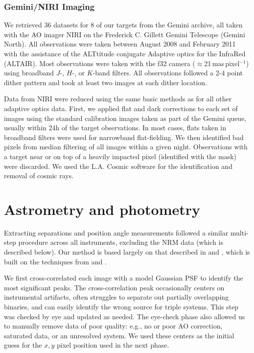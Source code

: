 \documentclass[twocolumn]{aastex62}
\begin{document}
\subsubsection{Gemini/NIRI Imaging}
We retrieved 36 datasets for 8 of our targets from the Gemini archive, all taken with the AO imager NIRI \citep{2003PASP..115.1388H} on the Frederick C. Gillett Gemini Telescope (Gemini North). All observations were taken between August 2008 and February 2011 with the assistance of the ALTtitude conjugate Adaptive optics for the InfraRed (ALTAIR). Most observations were taken with the f32 camera ($\approx$21\,mas\,pixel$^{-1}$) using broadband $J$-, $H$-, or $K$-band filters. All observations followed a 2-4 point dither pattern and took at least two images at each dither location. 

Data from NIRI were reduced using the same basic methods as for all other adaptive optics data. First, we applied flat and dark corrections to each set of images using the standard calibration images taken as part of the Gemini queue, usually within 24h of the target observations. In most cases, flats taken in broadband filters were used for narrowband flat-fielding. We then identified bad pixels from median filtering of all images within a given night. Observations with a target near or on top of a heavily impacted pixel (identified with the mask) were discarded. We used the L.A. Cosmic software for the identification and removal of cosmic rays. 

\section{Astrometry and photometry}\label{sec:astrometry}

Extracting separations and position angle measurements followed a similar multi-step procedure across all instruments, excluding the NRM data (which is described below). Our method is based largely on that described in \citet{2016ApJ...817...80D} and \citet{Dupuy2017}, which is built on the techniques from \citet{2008ApJ...689..436L} and \citet{2010ApJ...721.1725D}.

We first cross-correlated each image with a model Gaussian PSF to identify the most significant peaks. The cross-correlation peak occasionally centers on instrumental artifacts, often struggles to separate out partially overlapping binaries, and can easily identify the wrong source for triple systems. This step was checked by eye and updated as needed. The eye-check phase also allowed us to manually remove data of poor quality: e.g., no or poor AO correction, saturated data, or an unresolved system. We used these centers as the initial guess for the $x, y$ pixel position used in the next phase. 
\end{document}
